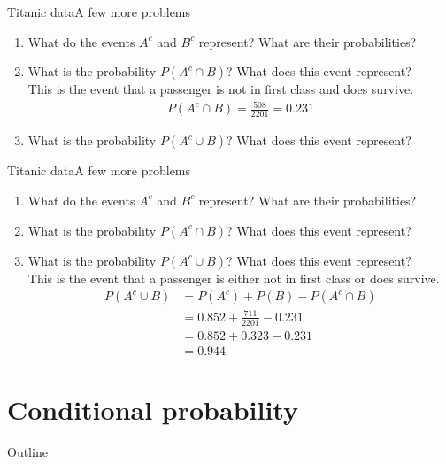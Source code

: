 \documentclass[xcolor=dvipsnames]{beamer}
\begin{document}
\begin{frame}{Titanic data}{A few more problems}
\begin{enumerate}
	\item What do the events $A^c$ and $B^c$ represent? What are their probabilities? 
	\item What is the probability $P(A^c \cap B)$? What does this event represent? \\
	This is the event that a passenger is not in first class and does survive.
	\begin{gather*}
		P(A^c \cap B) = \frac{508}{2201} = 0.231
	\end{gather*}
	\item What is the probability $P(A^c \cup B)$? What does this event represent?
\end{enumerate}
\end{frame}

\begin{frame}{Titanic data}{A few more problems}
\begin{enumerate}
	\item What do the events $A^c$ and $B^c$ represent? What are their probabilities?
	\item What is the probability $P(A^c \cap B)$? What does this event represent? 
	\item What is the probability $P(A^c \cup B)$? What does this event represent? \\
	This is the event that a passenger is either not in first class or does survive.
	\begin{align*}
		P(A^c \cup B) &= P(A^c) + P(B) - P(A^c \cap B)\\ 
		&= 0.852 + \frac{711}{2201} - 0.231 \\
		&= 0.852 + 0.323 - 0.231 \\
		&= 0.944
	\end{align*}
\end{enumerate}
\end{frame}

\section{Conditional probability}
\begin{frame}{Outline}
\tableofcontents[currentsection,subsectionstyle=show/shaded/hide]
\end{frame}
\end{document}
